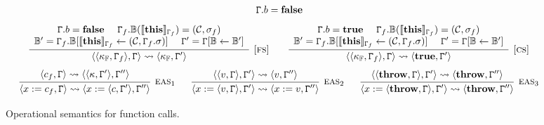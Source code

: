 \begin{figure}[t]
$${
	\begin{array}{c}	
	\mathtt{\Gamma}.b = \textbf{false}
	\end{array}
}
$$
\vspace{-0.5em}
$$
\infer[{[\rname{fs}]}]{\conf{\conf{\kappa_\mathbb{F},\cstate_f},\cstate} \leadsto \conf{\kappa_\mathbb{F},\cstate'}}
{
	\begin{array}{c}
	\cstate.b = \textbf{false}~~~~
	\cstate_f.\chain(\eval{\textbf{this}}_{\cstate_f}) = (\mathcal{C},\lstate_f)
	\\
	\chain' = \cstate_f.\chain[\eval{\textbf{this}}_{\cstate_f} \leftarrow (\mathcal{C},\cstate_f.\lstate)]
	~~~~
	\cstate' = \cstate[\chain \leftarrow \chain']
	\end{array}
}
~~~~~~
\infer[{[\rname{cs}]}]{\conf{\conf{\kappa_\mathbb{F},\cstate_f},\cstate} \leadsto \conf{\textbf{true},\cstate'}}
{
	\begin{array}{c}
	\cstate.b = \textbf{true}~~~~
\cstate_f.\chain(\eval{\textbf{this}}_{\cstate_f}) = (\mathcal{C},\lstate_f)
\\
\chain' = \cstate_f.\chain[\eval{\textbf{this}}_{\cstate_f} \leftarrow (\mathcal{C},\cstate_f.\lstate)]
~~~~
\cstate' = \cstate[\chain \leftarrow \chain']
	\end{array}
}
$$
$$
\infer[\rname{eas}_1]{\conf{x:=c_f,\cstate} \leadsto \conf{x:=\conf{c,\cstate'},\cstate''}}
{
\conf{c_f,\cstate} \leadsto \conf{\conf{\kappa,\cstate'},\cstate''}
}
~~~~~
\infer[\rname{eas}_2]{\conf{x:=\conf{v,\cstate},\cstate'} \leadsto \conf{x:= v,\cstate''}}
{
\conf{\conf{v,\cstate},\cstate'} \leadsto \conf{v,\cstate''}
}
~~~~~
\infer[\rname{eas}_3]{\conf{x:=\conf{\textbf{throw},\cstate},\cstate'} \leadsto \conf{\textbf{throw},\cstate''}}
{
	\conf{\conf{\textbf{throw},\cstate},\cstate'} \leadsto \conf{\textbf{throw},\cstate''}
}
$$
\caption{Operational semantics for function calls.}\label{fig:opfun}
\end{figure}

